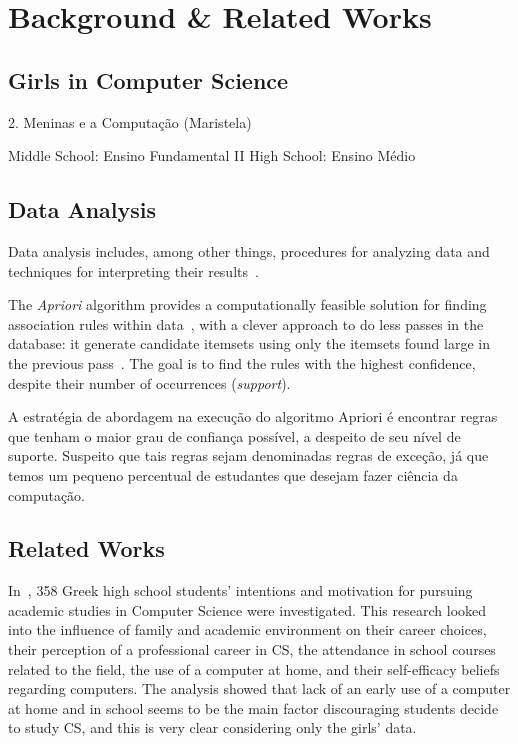\section{Background \& Related Works}\label{sec:background}%

\subsection{Girls in Computer Science}\label{subsec:background:girls}%
2. Meninas e a Computação (Maristela)

Middle School: Ensino Fundamental II
High School: Ensino Médio


\subsection{Data Analysis}\label{subsec:background:data}%

Data analysis includes, among other things, procedures for analyzing data and techniques for interpreting their results~\cite{Tukey1962}.

The \emph{Apriori} algorithm provides a computationally feasible solution for finding association rules within data~\cite{Hastie2009}, with a clever approach to do less passes in the database: it generate candidate itemsets using only the itemsets found large in the previous pass~\cite{Agrawal1994}. The goal is to find the rules with the highest confidence, despite their number of occurrences (\emph{support}).




A estratégia de abordagem na execução do algoritmo Apriori é encontrar regras que tenham o maior grau de confiança possível, a despeito de seu nível de suporte. Suspeito que tais regras sejam denominadas regras de exceção, já que temos um pequeno percentual de estudantes que desejam fazer ciência da computação.


%


\subsection{Related Works}\label{sec:background:related}%

In~\cite{papastergiou_are_2008}, 358 Greek high school students' intentions and motivation for pursuing academic studies in Computer Science were investigated. This research looked into the influence of family and academic environment on their career choices, their perception of a professional career in CS, the attendance in school courses related to the field, the use of a computer at home, and their self-efficacy beliefs regarding computers. The analysis showed that lack of an early use of a computer at home and in school seems to be the main factor discouraging students decide to study CS, and this is very clear considering only the girls' data.

